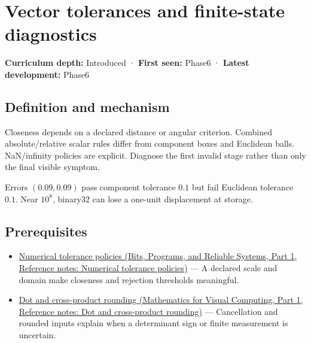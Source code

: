 \hypertarget{appendix-b5b83329215b}{}\label{referencestart:appendix-b5b83329215b}
\section{Vector tolerances and finite-state diagnostics}\label{appendix-b5b83329215b-vector-tolerances-and-finite-state-diagnostics}

\hypertarget{appendix-b5b83329215b-vector-tolerances-and-finite-state-diagnostics}{}

\textbf{Curriculum depth:} Introduced · \textbf{First seen:} Phase6 · \textbf{Latest development:} Phase6

\begin{allmightroledefinition}

\subsection{Definition and mechanism}\label{appendix-b5b83329215b-definition-and-mechanism}

\hypertarget{appendix-b5b83329215b-definition-and-mechanism}{}

Closeness depends on a declared distance or angular criterion. Combined absolute/relative scalar rules differ from component boxes and Euclidean balls. NaN/infinity policies are explicit. Diagnose the first invalid stage rather than only the final visible symptom.

\end{allmightroledefinition}

Errors \((0.09,0.09)\) pass component tolerance \(0.1\) but fail Euclidean tolerance \(0.1\). Near \(10^8\), binary32 can lose a one-unit displacement at storage.

\subsection{Prerequisites}\label{appendix-b5b83329215b-prerequisites}

\hypertarget{appendix-b5b83329215b-prerequisites}{}

\begin{itemize}
\tightlist
\item
  \href{../01-Bits-Programs-and-Reliable-Systems-P01/main.pdf\#appendix-0ec599f8ba27}{Numerical tolerance policies (Bits, Programs, and Reliable Systems, Part 1, Reference notes: Numerical tolerance policies)} --- A declared scale and domain make closeness and rejection thresholds meaningful.
\item
  \href{../02-Mathematics-for-Visual-Computing-P01/main.pdf\#appendix-5aef4f13483a}{Dot and cross-product rounding (Mathematics for Visual Computing, Part 1, Reference notes: Dot and cross-product rounding)} --- Cancellation and rounded inputs explain when a determinant sign or finite measurement is uncertain.
\end{itemize}

